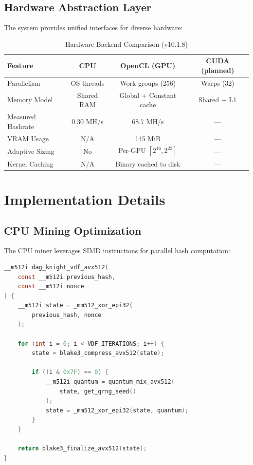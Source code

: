 \documentclass[11pt,a4paper]{article}
\begin{document}
\subsection{Hardware Abstraction Layer}

The system provides unified interfaces for diverse hardware:

\begin{table}[H]
\centering
\begin{tabular}{|l|c|c|c|}
\hline
\textbf{Feature} & \textbf{CPU} & \textbf{OpenCL (GPU)} & \textbf{CUDA (planned)} \\
\hline
Parallelism & OS threads & Work groups (256) & Warps (32) \\
Memory Model & Shared RAM & Global + Constant cache & Shared + L1 \\
Measured Hashrate & 0.30 MH/s & 68.7 MH/s & --- \\
VRAM Usage & N/A & 145 MiB & --- \\
Adaptive Sizing & No & Per-GPU $[2^{16}, 2^{23}]$ & --- \\
Kernel Caching & N/A & Binary cached to disk & --- \\
\hline
\end{tabular}
\caption{Hardware Backend Comparison (v10.1.8)}
\end{table}

\section{Implementation Details}

\subsection{CPU Mining Optimization}

The CPU miner leverages SIMD instructions for parallel hash computation:

\begin{lstlisting}[language=C, caption=AVX-512 SIMD Implementation]
__m512i dag_knight_vdf_avx512(
    const __m512i previous_hash,
    const __m512i nonce
) {
    __m512i state = _mm512_xor_epi32(
        previous_hash, nonce
    );
    
    for (int i = 0; i < VDF_ITERATIONS; i++) {
        state = blake3_compress_avx512(state);
        
        if ((i & 0x7F) == 0) {
            __m512i quantum = quantum_mix_avx512(
                state, get_qrng_seed()
            );
            state = _mm512_xor_epi32(state, quantum);
        }
    }
    
    return blake3_finalize_avx512(state);
}
\end{lstlisting}
\end{document}
